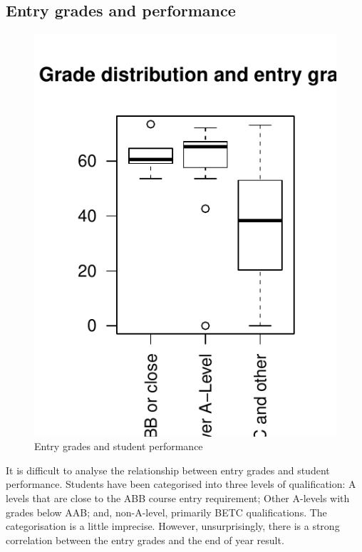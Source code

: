 \documentclass[12pt, a4paper, oneside]{article}\usepackage[]{graphicx}\usepackage[]{color}
\makeatletter
\def\maxwidth{ %
  \ifdim\Gin@nat@width>\linewidth
    \linewidth
  \else
    \Gin@nat@width
  \fi
}
\newenvironment{knitrout}{}{} %
\makeatother
\begin{document}
\subsection*{Entry grades and performance}
\begin{knitrout}
\color{fgcolor}\begin{figure}[h]

\includegraphics[width=\maxwidth]{figure/boxplot2} \caption[Entry grades and student performance]{Entry grades and student performance\label{fig:boxplot2}}
\end{figure}


\end{knitrout}

It is difficult to analyse the relationship between entry grades and student performance.  Students have been categorised into three levels of qualification:  A levels that are close to the ABB course entry requirement; Other A-levels with grades below AAB; and, non-A-level, primarily BETC qualifications.  The categorisation is a little imprecise.  However, unsurprisingly, there is a strong correlation between the entry grades and the end of year result.
\end{document}
